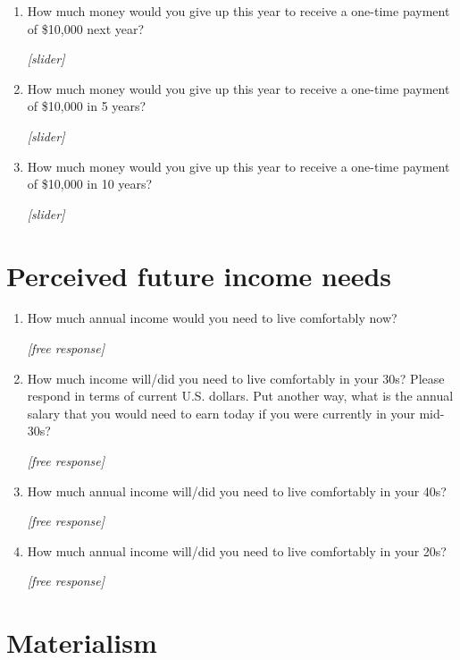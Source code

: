 \documentclass[11pt, headsepline]{article}
\begin{document}
\begin{enumerate}[resume]
    \item How much money would you give up this year to receive a one-time payment of \$10,000 next year?

    \textit{[slider]}

    \item How much money would you give up this year to receive a one-time payment of \$10,000 in 5 years?

    \textit{[slider]}

    \item How much money would you give up this year to receive a one-time payment of \$10,000 in 10 years?

    \textit{[slider]}
\end{enumerate}

\section{Perceived future income needs}

\begin{enumerate}[resume]
    \item How much annual income would you need to live comfortably now?

    \textit{[free response]}

    \item How much income will/did you need to live comfortably in your 30s? Please respond in terms of current U.S. dollars. Put another way, what is the annual salary that you would need to earn today if you were currently in your mid-30s?

    \textit{[free response]}

    \item How much annual income will/did you need to live comfortably in your 40s?

    \textit{[free response]}

    \item How much annual income will/did you need to live comfortably in your 20s?

    \textit{[free response]}
\end{enumerate}

\section{Materialism}
\end{document}
